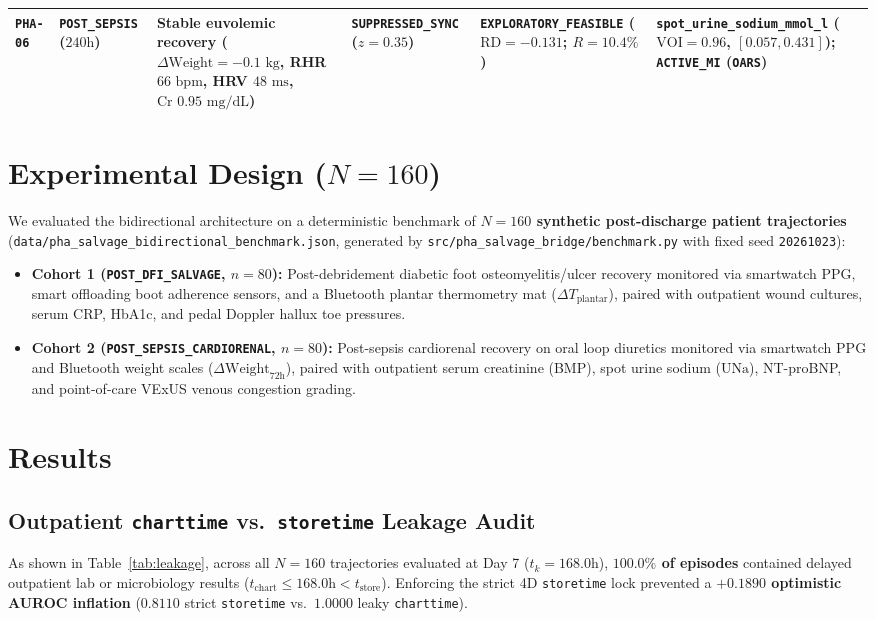 \documentclass[10pt,twocolumn,letterpaper]{article}
\begin{document}
\begin{table}[t]
{\begin{tabular}{llp{4.8cm}lll}
\texttt{PHA-06} & \texttt{POST\_SEPSIS} ($240\text{h}$) & Stable euvolemic recovery ($\Delta\text{Weight}=-0.1\text{ kg}$, RHR $66\text{ bpm}$, HRV $48\text{ ms}$, $\text{Cr } 0.95\text{ mg/dL}$) & \textbf{\texttt{SUPPRESSED\_SYNC}} ($z=0.35$) & \texttt{EXPLORATORY\_FEASIBLE} ($\text{RD}=-0.131$; $R=10.4\%$) & \texttt{spot\_urine\_sodium\_mmol\_l} ($\text{VOI}=0.96$, $[0.057, 0.431]$); \textbf{\texttt{ACTIVE\_MI}} (\texttt{OARS}) \\
\bottomrule
\end{tabular}
}
\label{tab:scenarios}
\end{table}

\section{Experimental Design ($N = 160$)}

We evaluated the bidirectional architecture on a deterministic benchmark of \textbf{$N = 160$ synthetic post-discharge patient trajectories} (\texttt{data/pha\_salvage\_bidirectional\_benchmark.json}, generated by \texttt{src/pha\_salvage\_bridge/benchmark.py} with fixed seed \texttt{20261023}):
\begin{itemize}
    \item \textbf{Cohort 1 (\texttt{POST\_DFI\_SALVAGE}, $n = 80$):} Post-debridement diabetic foot osteomyelitis/ulcer recovery monitored via smartwatch PPG, smart offloading boot adherence sensors, and a Bluetooth plantar thermometry mat ($\Delta T_{\text{plantar}}$), paired with outpatient wound cultures, serum CRP, HbA1c, and pedal Doppler hallux toe pressures.
    \item \textbf{Cohort 2 (\texttt{POST\_SEPSIS\_CARDIORENAL}, $n = 80$):} Post-sepsis cardiorenal recovery on oral loop diuretics monitored via smartwatch PPG and Bluetooth weight scales ($\Delta\text{Weight}_{72\text{h}}$), paired with outpatient serum creatinine (BMP), spot urine sodium ($\text{UNa}$), NT-proBNP, and point-of-care VExUS venous congestion grading.
\end{itemize}

\section{Results}

\subsection{Outpatient \texttt{charttime} vs.\ \texttt{storetime} Leakage Audit}
As shown in Table~\ref{tab:leakage}, across all $N = 160$ trajectories evaluated at Day 7 ($t_k = 168.0\text{h}$), \textbf{$100.0\%$ of episodes} contained delayed outpatient lab or microbiology results ($t_{\text{chart}} \le 168.0\text{h} < t_{\text{store}}$). Enforcing the strict 4D \texttt{storetime} lock prevented a \textbf{$+0.1890$ optimistic AUROC inflation} ($0.8110$ strict \texttt{storetime} vs.\ $1.0000$ leaky \texttt{charttime}).
\end{document}
